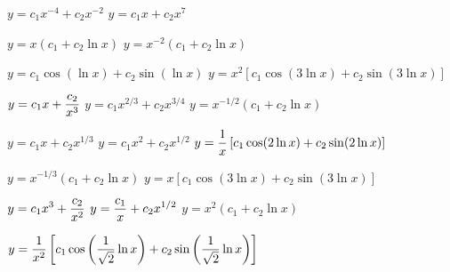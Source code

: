 \medskip

 $y=c_{1}x^{-4}+c_{2}x^{-2}$
  $y=c_{1}x+c_{2}x^{7}$

 $y=x(c_{1}+c_{2}\ln x)$
 $y=x^{-2}(c_{1}+c_{2}\ln x)$

 $y=c_{1}\cos(\ln x)+c_{2}\sin(\ln x)$
 $y=x^{2}[c_{1}\cos(3\ln x)+c_{2}\sin(3\ln x)]$

 $y=\displaystyle{c_{1}x+\frac{c_{2}}{x^{3}}}$
$y=c_{1}x^{2/3}+c_{2}x^{3/4}$
 $y=x^{-1/2}(c_{1}+c_{2}\ln x)$

 $y=c_{1}x+c_{2}x^{1/3}$
 $y=c_{1}x^{2}+c_{2}x^{1/2}$
$y=\displaystyle{
 \frac{1}{x}\left[c_{1}\cos(2\ln x)+c_{2}\sin(2\ln x)\right]}$

 $y=x^{-1/3}(c_{1}+c_{2}\ln x)$
 $y=x\left[c_{1}\cos(3\ln x)+c_{2}\sin(3\ln
x)\right]$

 $y=\displaystyle{c_{1}x^{3}+\frac{c_{2}}{x^{2}}}$
$y=\displaystyle{\frac{c_{1}}{x}+c_{2}x^{1/2}}$
 $y=x^{2}(c_{1}+c_{2}\ln x)$

$y=\displaystyle{\frac{1}{x^{2}}
\left[c_{1}\cos\left(\frac{1}{\sqrt{2}}\ln x\right)+c_{2}\sin
\left(\frac{1}{\sqrt{2}}\ln x\right)\right]}$

